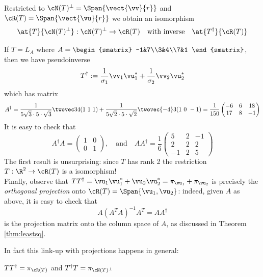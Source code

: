 Restricted to $\cN(T)^\perp=\Span\{\vect{\vv}{r}\}$ and $\cR(T)=\Span\{\vect{\vu}{r}\}$ we obtain an isomorphism
\[\at{T}{\cN(T)^\perp}:\cN(T)^\perp\to\cR(T)\quad\text{with  inverse}\quad \at{T^\dag}{\cR(T)}\]

\begin{example}{}{}
If $T=L_A$ where $A=\begin{smatrix}
  -1&7\\3&4\\7&1
  \end{smatrix}$, then we have pseudoinverse
  \[T^\dag:=\frac 1{\sigma_1}\vv_1\vu_1^*+\frac 1{\sigma_2}\vv_2\vu_2^*\]
  which has matrix
  \[A^\dag=\frac 1{5\sqrt 3\cdot 5\cdot\sqrt 3}\twovec 34(1\ 1\ 1) +\frac 1{5\sqrt 2\cdot 5\cdot\sqrt 2}\twovec{-4}3(1\ 0\ -1) =\frac 1{150}
  \begin{pmatrix}
  -6&6&18\\17&8&-1
  \end{pmatrix}\]
  It is easy to check that
  \[A^\dag A=\begin{pmatrix}
  1&0\\0&1
  \end{pmatrix},
  \quad\text{and}\quad
  AA^\dag=\frac 16\begin{pmatrix}
  5&2&-1\\2&2&2\\-1&2&5
  \end{pmatrix}\]
  The first result is unsurprising: since $T$ has rank 2 the restriction $T:\R^2\to\cR(T)$ is a isomorphism!\\
  Finally, observe that $TT^\dag=\vu_1\vu_1^*+\vu_2\vu_2^*=\pi_{\vu_1}+\pi_{\vu_2}$ is precisely the \emph{orthogonal projection} onto $\cR(T)=\Span\{\vu_1,\vu_2\}$: indeed, given $A$ as above, it is easy to check that
  \[A(A^TA)^{-1}A^T=AA^\dag\]
  is the projection matrix onto the column space of $A$, as discussed in Theorem \ref{thm:leastsq}.
\end{example}

In fact this link-up with projections happens in general:

\begin{cor}{}{}
$TT^\dag=\pi_{\cR(T)}$ and $T^\dag T=\pi_{\cN(T)^\perp}$
\end{cor}

